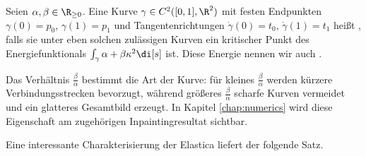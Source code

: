 \documentclass{mythesis}
\begin{document}
\begin{definition} \label{definition:elastica}
    Seien $\alpha, \beta \in \R_{\ge 0}$.
    Eine Kurve $\gamma \in C^2([0,1], \R^2)$ mit festen Endpunkten $\gamma(0) = p_0$, $\gamma(1) = p_1$ und Tangentenrichtungen $\dot\gamma(0) = t_0$, $\dot\gamma(1) = t_1$ heißt , falls sie unter eben solchen zulässigen Kurven ein kritischer Punkt des Energiefunktionals
    \begin{math}
	\int_\gamma \alpha + \beta \kappa^2 \di[s]
    \end{math}
    ist.
    Diese Energie nennen wir auch .
    \begin{note}
	Das Verhältnis $\frac{\beta}{\alpha}$ bestimmt die Art der Kurve: für kleines $\frac{\beta}{\alpha}$ werden kürzere Verbindungsstrecken bevorzugt, während größeres $\frac{\beta}{\alpha}$ scharfe Kurven vermeidet und ein glatteres Gesamtbild erzeugt.
	In Kapitel \ref{chap:numerics} wird diese Eigenschaft am zugehörigen Inpaintingresultat sichtbar.
    \end{note}
\end{definition}

Eine interessante Charakterisierung der Elastica liefert der folgende Satz.
\end{document}
